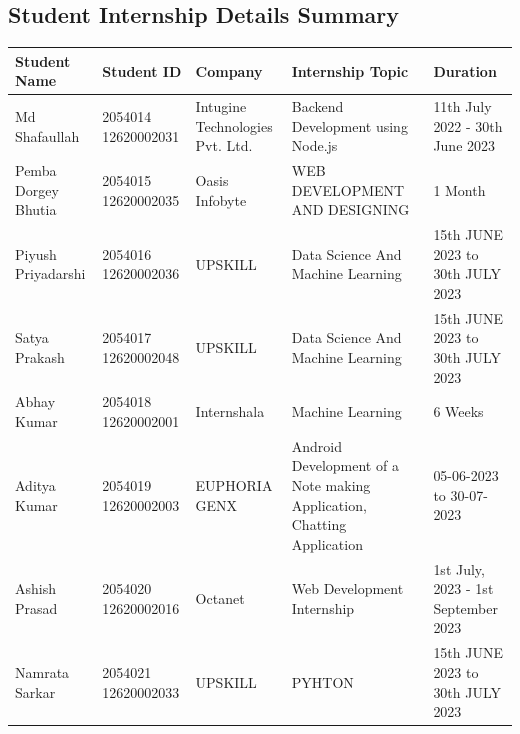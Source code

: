 \documentclass[11pt,a4paper]{article}
\newenvironment{card}{
    \begin{tcolorbox}[
        enhanced,
        colback=cardback,
        colframe=border,
        sharp corners,
        boxrule=0.5pt,
        drop shadow,
        shadow xshift=1mm,
        shadow yshift=-1mm,
        shadow color=border!50,
        boxsep=3mm,
        left=5mm, right=5mm, top=5mm, bottom=5mm,
        width=\textwidth,
        nobeforeafter
    ]
}{\end{tcolorbox}}
\begin{document}
\vspace{0.5cm}

\begin{card}
    \subsection*{\textcolor{accent}{Student Internship Details Summary}}
    \vspace{0.3cm}
    \begin{longtable}{@{}p{}p{}p{}p{}p{}@{}}
        \toprule
        \textbf{Student Name} & \textbf{Student ID} & \textbf{Company} & \textbf{Internship Topic} & \textbf{Duration} \\
        \midrule
        \endhead
        Md Shafaullah & 2054014 12620002031 & Intugine Technologies Pvt. Ltd. & Backend Development using Node.js & 11th July 2022 - 30th June 2023 \\
        Pemba Dorgey Bhutia & 2054015 12620002035 & Oasis Infobyte & WEB DEVELOPMENT AND DESIGNING & 1 Month \\
        Piyush Priyadarshi & 2054016 12620002036 & UPSKILL & Data Science And Machine Learning & 15th JUNE 2023 to 30th JULY 2023 \\
        Satya Prakash & 2054017 12620002048 & UPSKILL & Data Science And Machine Learning & 15th JUNE 2023 to 30th JULY 2023 \\
        Abhay Kumar & 2054018 12620002001 & Internshala & Machine Learning & 6 Weeks \\
        Aditya Kumar & 2054019 12620002003 & EUPHORIA GENX & Android Development of a Note making Application, Chatting Application & 05-06-2023 to 30-07-2023 \\
        Ashish Prasad & 2054020 12620002016 & Octanet & Web Development Internship & 1st July, 2023 - 1st September 2023 \\
        Namrata Sarkar & 2054021 12620002033 & UPSKILL & PYHTON & 15th JUNE 2023 to 30th JULY 2023 \\
        \bottomrule
    \end{longtable}
\end{card}

\vspace{0.5cm}
\end{document}
